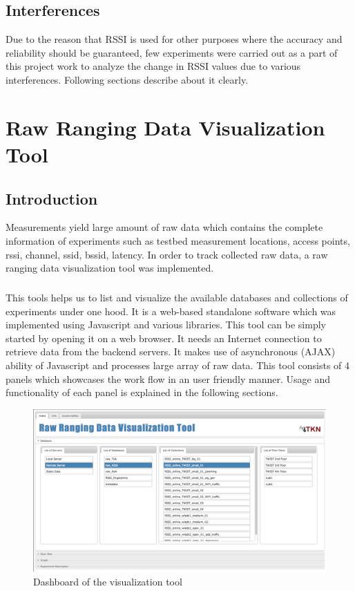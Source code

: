 \documentclass[11pt,a4paper,headinclude,footinclude,chapterprefix=on]{scrreprt}
\begin{document}
\section{Interferences} Due to the reason that RSSI is used for other purposes where the accuracy and reliability should be guaranteed, few experiments were carried out as a part of this project work to analyze the change in RSSI values due to various interferences. Following sections describe about it clearly.

\chapter{Raw Ranging Data Visualization Tool} 
\section*{Introduction} Measurements yield large amount of raw data which contains the complete information of experiments such as testbed measurement locations, access points, rssi, channel, ssid, bssid, latency. In order to track collected raw data, a raw ranging data visualization tool was implemented. 

\paragraph{}This tools helps us to list and visualize the available databases and collections of experiments under one hood. It is a web-based standalone software which was implemented using Javascript and various libraries. This tool can be simply started by opening it on a web browser. It needs an Internet connection to retrieve data from the backend servers. It makes use of asynchronous (AJAX) ability of Javascript and processes large array of raw data. This tool consists of 4 panels which showcases the work flow in an user friendly manner. Usage and functionality of each panel is explained in the following sections. 
\begin{figure}
	[!h] \centering 
	\includegraphics[width=13cm]{Images/tool_db.png} \caption{Dashboard of the visualization tool} \label{fig:tool:db} 
\end{figure}
\end{document}
